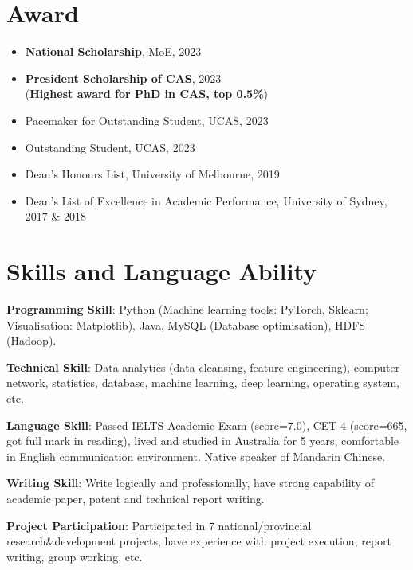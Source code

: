 \documentclass[letterpaper,10.9pt]{article}
\begin{document}

\section{\textbf{Award}}
\vspace{-5mm}
\begin{multicols}{2}
\begin{itemize}
  \setlength\itemsep{2.0pt}
  \item \textbf{National Scholarship}, MoE, 2023
  \item \textbf{President Scholarship of CAS}, 2023\\(\textbf{Highest award for PhD in CAS, top 0.5\%})
  \item Pacemaker for Outstanding Student, UCAS, 2023
  \item Outstanding Student, UCAS, 2023
  \item Dean's Honours List, University of Melbourne, 2019
  \item Dean's List of Excellence in Academic Performance, University of Sydney, 2017 \& 2018
\end{itemize}
\end{multicols}




\section{\textbf{Skills and Language Ability}}
\textbf{Programming Skill}: Python (Machine learning tools: PyTorch, Sklearn; Visualisation: Matplotlib), Java, MySQL (Database optimisation), HDFS (Hadoop). 

\vspace{2mm}

\textbf{Technical Skill}: Data analytics (data cleansing, feature engineering), computer network, statistics, database, machine learning, deep learning, operating system, etc. 

\vspace{2mm}

\textbf{Language Skill}: Passed IELTS Academic Exam (score=7.0), CET-4 (score=665, got full mark in reading), lived and studied in Australia for 5 years, comfortable in English communication environment. Native speaker of Mandarin Chinese. 

\vspace{2mm}

\textbf{Writing Skill}: Write logically and professionally, have strong capability of academic paper, patent and technical report writing. 

\vspace{2mm}

\textbf{Project Participation}: Participated in 7 national/provincial research\&development projects, have experience with project execution, report writing, group working, etc. 
\end{document}
